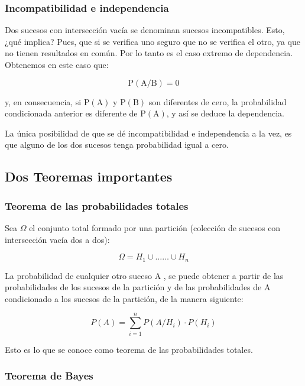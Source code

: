 \documentclass[
]{article}
\begin{document}
\subsubsection{Incompatibilidad e independencia}\label{incompatibilidad-e-independencia}

Dos sucesos con intersección vacía se denominan sucesos incompatibles.
Esto, ¿qué implica? Pues, que si se verifica uno seguro que no se
verifica el otro, ya que no tienen resultados en común. Por lo tanto es
el caso extremo de dependencia. Obtenemos en este caso que:

\[
\mathrm{P}(\mathrm{A} / \mathrm{B})=0
\]

y, en consecuencia, si \(\mathrm{P}(\mathrm{A})\) y
\(\mathrm{P}(\mathrm{B})\) son diferentes de cero, la probabilidad
condicionada anterior es diferente de \(\mathrm{P}(\mathrm{A})\), y así se
deduce la dependencia.

La única posibilidad de que se dé incompatibilidad e independencia a la
vez, es que alguno de los dos sucesos tenga probabilidad igual a cero.

\subsection{Dos Teoremas importantes}\label{dos-teoremas-importantes}

\subsubsection{Teorema de las probabilidades totales}\label{teorema-de-las-probabilidades-totales}

Sea \(\Omega\) el conjunto total formado por una partición (colección de
sucesos con intersección vacía dos a dos):

\[
\Omega=H_{1} \cup \ldots \ldots \cup H_{n}
\]

La probabilidad de cualquier otro suceso A , se puede obtener a partir
de las probabilidades de los sucesos de la partición y de las
probabilidades de A condicionado a los sucesos de la partición, de la
manera siguiente:

\[
P(A)=\sum_{i=1}^{n} P\left(A / H_{i}\right) \cdot P\left(H_{i}\right)
\]

Esto es lo que se conoce como teorema de las probabilidades totales.

\subsubsection{Teorema de Bayes}\label{teorema-de-bayes}
\end{document}
